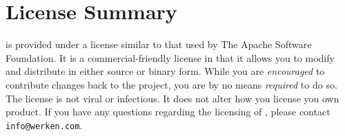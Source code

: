 \normalsize

\section{License Summary}

\drools{} is provided under a license similar to that used by
The Apache Software Foundation.  It is a commercial-friendly license
in that it allows you to modify and distribute \drools{} in either
source or binary form.  While you are \emph{encouraged} to contribute
changes back to the project, you are by no means \emph{required} to
do so.   The \drools{} license is not viral or infectious.  It
does not alter how you license you own product.  If you have any
questions regarding the licensing of \drools{}, please contact
\verb|info@werken.com|.

